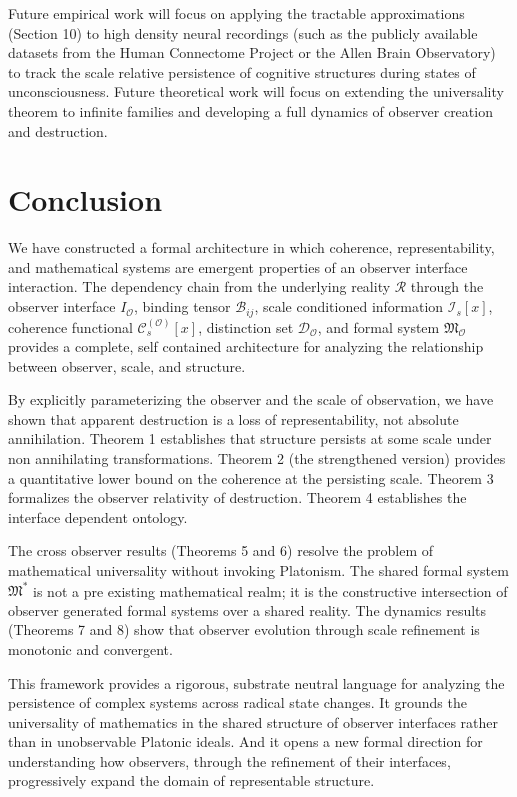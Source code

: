\documentclass[12pt]{article}
\theoremstyle{definition}
\begin{document}
Future empirical work will focus on applying the tractable approximations (Section 10) to high density neural recordings (such as the publicly available datasets from the Human Connectome Project or the Allen Brain Observatory) to track the scale relative persistence of cognitive structures during states of unconsciousness. Future theoretical work will focus on extending the universality theorem to infinite families and developing a full dynamics of observer creation and destruction.

\section{Conclusion}

We have constructed a formal architecture in which coherence, representability, and mathematical systems are emergent properties of an observer interface interaction. The dependency chain from the underlying reality $\mathcal{R}$ through the observer interface $I_{\mathcal{O}}$, binding tensor $\mathcal{B}_{ij}$, scale conditioned information $\mathcal{I}_s[x]$, coherence functional $\mathcal{C}_s^{(\mathcal{O})}[x]$, distinction set $\mathcal{D}_{\mathcal{O}}$, and formal system $\mathfrak{M}_{\mathcal{O}}$ provides a complete, self contained architecture for analyzing the relationship between observer, scale, and structure.

By explicitly parameterizing the observer and the scale of observation, we have shown that apparent destruction is a loss of representability, not absolute annihilation. Theorem 1 establishes that structure persists at some scale under non annihilating transformations. Theorem 2 (the strengthened version) provides a quantitative lower bound on the coherence at the persisting scale. Theorem 3 formalizes the observer relativity of destruction. Theorem 4 establishes the interface dependent ontology.

The cross observer results (Theorems 5 and 6) resolve the problem of mathematical universality without invoking Platonism. The shared formal system $\mathfrak{M}^*$ is not a pre existing mathematical realm; it is the constructive intersection of observer generated formal systems over a shared reality. The dynamics results (Theorems 7 and 8) show that observer evolution through scale refinement is monotonic and convergent.

This framework provides a rigorous, substrate neutral language for analyzing the persistence of complex systems across radical state changes. It grounds the universality of mathematics in the shared structure of observer interfaces rather than in unobservable Platonic ideals. And it opens a new formal direction for understanding how observers, through the refinement of their interfaces, progressively expand the domain of representable structure.
\end{document}
